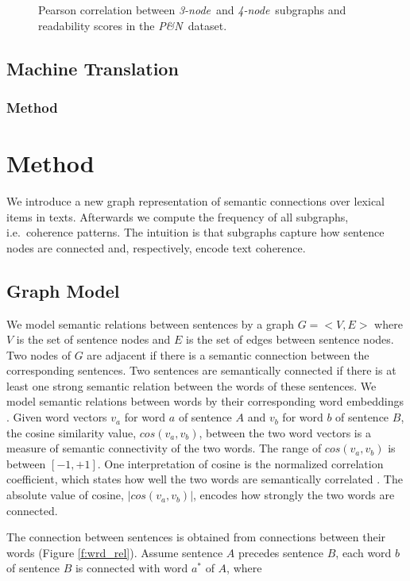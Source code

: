 \begin{figure}[!ht]
\centering
\small
%
\caption{Pearson correlation between \emph{3-node}\ and \emph{4-node}\
  subgraphs and readability scores in the \emph{P\&N}\ dataset.}
\label{fig:correlated_graphs}
\end{figure}


\subsection{Machine Translation}
\label{subsec:machine_translation}
\subsubsection{Method}
\section{Method}
\label{sec:method}
%
We introduce a new graph representation of semantic connections over
lexical items in texts. Afterwards we compute the frequency of all
subgraphs, i.e.\ coherence patterns. The intuition is that subgraphs
capture how sentence nodes are connected and, respectively,
encode text coherence.


\subsection{Graph Model} 
%
We model semantic relations between sentences by a graph
$G=\text{$<$}V,E\text{$>$}$ where $V$ is the set of sentence nodes and
$E$ is the set of edges between sentence nodes. Two nodes of $G$ are
adjacent if there is a semantic connection between the
corresponding sentences. Two sentences are semantically
connected if there is at least one strong semantic relation between
the words of these sentences. We model semantic relations between
words by their corresponding word embeddings
\cite{pennington14}. Given word vectors $v_a$ for word $a$ of sentence
$A$ and $v_b$ for word $b$ of sentence $B$, the cosine similarity
value, $cos(v_a,v_b)$, between the two word vectors is a measure of
semantic connectivity of the two words. The range of $cos(v_a,v_b)$
is between $[-1,+1]$. One interpretation of cosine is the normalized
correlation coefficient, which states how well the two words are
semantically correlated \cite{manning99}. The absolute value of
cosine, $|cos(v_a,v_b)|$, encodes how strongly the two words are
connected.

The connection between sentences is obtained from connections between their words (Figure \ref{f:wrd_rel}). Assume sentence $A$ precedes sentence $B$, each word $b$ of sentence $B$ is connected with word $a^*$ of $A$, where

